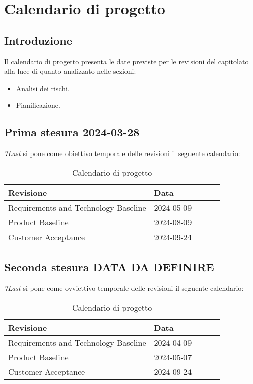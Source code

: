 \section{Calendario di progetto}
\subsection{Introduzione}
Il calendario di progetto presenta le date previste per le revisioni del capitolato alla luce di quanto analizzato nelle sezioni:
\begin{itemize}
    \item Analisi dei rischi. 
    \item Pianificazione.
\end{itemize}

\subsection{Prima stesura 2024-03-28}
\textit{7Last} si pone come obiettivo temporale delle revisioni il seguente calendario:
\begin{table}[!h]
    \begin{center}
        \begin{tabular}{ |l |l |l |l| l| }
            \hline 
            Revisione                               & Data       \\ \hline
            Requirements and Technology Baseline    & 2024-05-09 \\
            Product Baseline                        & 2024-08-09 \\
            Customer Acceptance                     & 2024-09-24 \\
            \hline
        \end{tabular}
    \end{center}
    \caption{Calendario di progetto}
    \label{tab:1}
\end{table}
\newpage

\subsection{Seconda stesura DATA DA DEFINIRE}
\textit{7Last} si pone come ovviettivo temporale delle revisioni il seguente calendario:

\begin{table}[!h]
    \begin{center}
        \begin{tabular}{ |l |l |l |l| l| }
            \hline 
            Revisione                               & Data       \\ \hline
            Requirements and Technology Baseline    & 2024-04-09 \\
            Product Baseline                        & 2024-05-07 \\
            Customer Acceptance                     & 2024-09-24 \\
            \hline
        \end{tabular}
    \end{center}
    \caption{Calendario di progetto}
    \label{tab:2}
\end{table}
